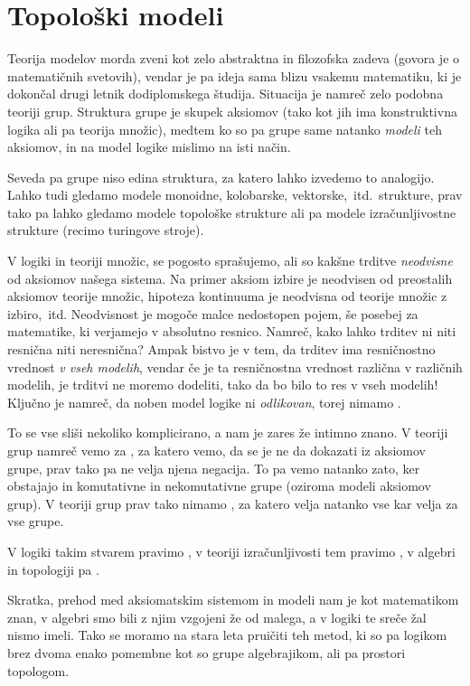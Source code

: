 \section{Topološki modeli}

Teorija modelov morda zveni kot zelo abstraktna in filozofska zadeva (govora je
o matematičnih svetovih), vendar je pa ideja sama blizu vsakemu matematiku, ki
je dokončal drugi letnik dodiplomskega študija.
Situacija je namreč zelo podobna teoriji grup. Struktura grupe je skupek
aksiomov (tako kot jih ima konstruktivna logika ali pa teorija množic), medtem
ko so pa grupe same natanko \emph{modeli} teh aksiomov, in na model logike
mislimo na isti način.

Seveda pa grupe niso edina struktura, za katero lahko izvedemo to analogijo.
Lahko tudi gledamo modele monoidne, kolobarske, vektorske,~itd.~strukture, prav
tako pa lahko gledamo modele topološke strukture ali pa modele izračunljivostne
strukture (recimo turingove stroje).

V logiki in teoriji množic, se pogosto sprašujemo, ali so kakšne trditve
\emph{neodvisne} od aksiomov našega sistema. Na primer aksiom izbire je
neodvisen od preostalih aksiomov teorije množic, hipoteza kontinuuma je
neodvisna od teorije množic z izbiro,~itd. Neodvisnost je mogoče malce
nedostopen pojem, še posebej za matematike, ki verjamejo v absolutno resnico.
Namreč, kako lahko trditev ni niti resnična niti neresnična? Ampak bistvo je v
tem, da trditev ima resničnostno vrednost \emph{v vseh modelih}, vendar če je ta
resničnostna vrednost različna v različnih modelih, je trditvi ne moremo
dodeliti, tako da bo bilo to res v vseh modelih! Ključno je namreč, da noben
model logike ni \emph{odlikovan}, torej nimamo .

To se vse sliši nekoliko komplicirano, a nam je zares že intimno znano. V
teoriji grup namreč vemo za , za katero vemo, da se je ne da
dokazati iz aksiomov grupe, prav tako pa ne velja njena negacija. To pa vemo
natanko zato, ker obstajajo in komutativne in nekomutativne grupe (oziroma
modeli aksiomov grup). V teoriji grup prav tako nimamo ,
za katero velja natanko vse kar velja za vse grupe.

V logiki takim stvarem pravimo , v teoriji
izračunljivosti tem pravimo , v algebri in
topologiji pa .

Skratka, prehod med aksiomatskim sistemom in modeli nam je kot matematikom znan,
v algebri smo bili z njim vzgojeni že od malega, a v logiki te sreče žal nismo
imeli. Tako se moramo na stara leta pruičiti teh metod, ki so pa logikom brez
dvoma enako pomembne kot so grupe algebrajikom, ali pa prostori topologom.

